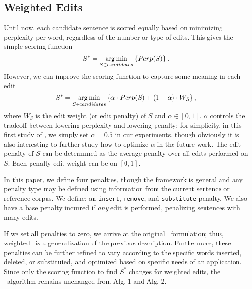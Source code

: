 \subsection{Weighted Edits}
\label{sec:weighted}

Until now, each candidate sentence is scored equally based on minimizing
perplexity per word, regardless of the number or type of edits. This gives the
simple scoring function
$$S^*=\operatorname*{arg\,min}_{S\in candidates}\left\{Perp(S)\right\}.$$
However, we can improve the scoring function to capture some meaning in each
edit:
$$S^*=\operatorname*{arg\,min}_{S\in candidates}\left\{\alpha\cdot
Perp(S)+(1-\alpha)\cdot W_S\right\},$$
where $W_S$ is the edit weight (or edit penalty) of $S$ and $\alpha\in[0,1]$.
$\alpha$ controls the tradeoff between lowering perplexity and lowering penalty;
for simplicity, in this first study of \sd, we simply set $\alpha=0.5$ in our
experiments, though obviously it is also interesting to further study how to
optimize $\alpha$ in the future work. The edit penalty of $S$ can be determined
as the average penalty over all edits performed on $S$. Each penalty edit weight
can be on $[0,1]$.

In this paper, we define four penalties, though the framework is general and any
penalty type may be defined using information from the current sentence or
reference corpus. We define: an \texttt{insert}, \texttt{remove}, and
\texttt{substitute} penalty. We also have a base penalty incurred if \emph{any}
edit is performed, penalizing sentences with many edits.

If we set all penalties to zero, we arrive at the original \sd~formulation;
thus, weighted \sd~is a generalization of the previous description. Furthermore,
these penalties can be further refined to vary according to the specific words
inserted, deleted, or substituted, and optimized based on specific needs of an
application. Since only the scoring function to find $S^*$ changes for weighted
edits, the \sd~algorithm remains unchanged from Alg. 1 and Alg. 2.
